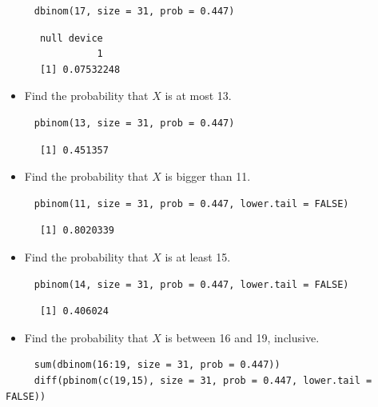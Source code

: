 \documentclass[captions=tableheading]{scrbook}
\begin{document}
\begin{xca}
\begin{verbatim}
     dbinom(17, size = 31, prob = 0.447)
\end{verbatim}

\begin{verbatim}
      null device 
                1
      [1] 0.07532248
\end{verbatim}

\begin{itemize}
\item Find the probability that \(X\) is at most 13.
\end{itemize}

\begin{verbatim}
     pbinom(13, size = 31, prob = 0.447)
\end{verbatim}

\begin{verbatim}
      [1] 0.451357
\end{verbatim}

\begin{itemize}
\item Find the probability that \(X\) is bigger than 11.
\end{itemize}

\begin{verbatim}
     pbinom(11, size = 31, prob = 0.447, lower.tail = FALSE)
\end{verbatim}

\begin{verbatim}
      [1] 0.8020339
\end{verbatim}

\begin{itemize}
\item Find the probability that \(X\) is at least 15.
\end{itemize}

\begin{verbatim}
     pbinom(14, size = 31, prob = 0.447, lower.tail = FALSE)
\end{verbatim}

\begin{verbatim}
      [1] 0.406024
\end{verbatim}

\begin{itemize}
\item Find the probability that \(X\) is between 16 and 19, inclusive.
\end{itemize}

\begin{verbatim}
     sum(dbinom(16:19, size = 31, prob = 0.447))
     diff(pbinom(c(19,15), size = 31, prob = 0.447, lower.tail = FALSE))
\end{verbatim}


\end{xca}
\end{document}
